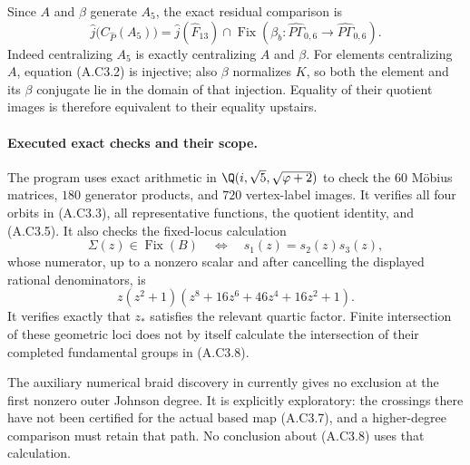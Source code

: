 Since $A$ and $\beta$ generate $A_5$, the exact residual
comparison is
\[
 \widehat j\bigl(C_{\widehat P}(A_5)\bigr)
   =\widehat j(\widehat F_{13})\cap
       \operatorname{Fix}\!\left(
          \beta_b:\widehat{P\Gamma}_{0,6}
                    \longrightarrow\widehat{P\Gamma}_{0,6}
                          \right).                    \tag{A.C3.8}
\]
Indeed centralizing $A_5$ is exactly centralizing $A$ and
$\beta$.  For elements centralizing $A$, equation (A.C3.2)
is injective; also $\beta$ normalizes $K$, so both the
element and its $\beta$ conjugate lie in the domain of
that injection.  Equality of their quotient images is
therefore equivalent to their equality upstairs.

\paragraph{Executed exact checks and their scope.}
The program 
uses exact arithmetic in $\Q(i,\sqrt5,\sqrt{\varphi+2})$
to check the $60$ M\"obius matrices, $180$ generator
products, and $720$ vertex-label images.  It verifies all
four orbits in (A.C3.3), all representative functions,
the quotient identity, and (A.C3.5).  It also checks
the fixed-locus calculation
\[
 \Sigma(z)\in\operatorname{Fix}(B)
 \quad\Longleftrightarrow\quad s_1(z)=s_2(z)s_3(z),
\]
whose numerator, up to a nonzero scalar and after
cancelling the displayed rational denominators, is
\[
 z(z^2+1)(z^8+16z^6+46z^4+16z^2+1).                    \tag{A.C3.9}
\]
It verifies exactly that $z_*$ satisfies the relevant
quartic factor.  Finite intersection of these geometric
loci does not by itself calculate the intersection of
their completed fundamental groups in (A.C3.8).

The auxiliary numerical braid discovery in
 currently gives
no exclusion at the first nonzero outer Johnson degree.
It is explicitly exploratory: the crossings there have
not been certified for the actual based map (A.C3.7),
and a higher-degree comparison must retain that path.
No conclusion about (A.C3.8) uses that calculation.

